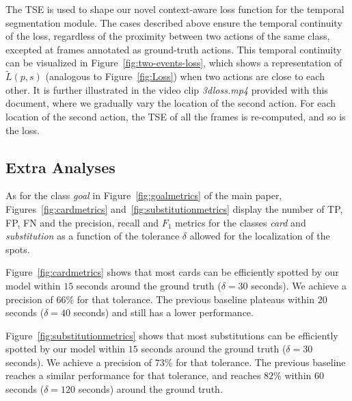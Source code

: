 \documentclass[10pt,twocolumn,letterpaper]{article}
\begin{document}
The TSE is used to shape our novel context-aware loss function for the temporal segmentation module. The cases described above ensure the temporal continuity of the loss, regardless of the proximity between two actions of the same class, excepted at frames annotated as ground-truth actions. This temporal continuity can be visualized in Figure~\ref{fig:two-events-loss}, which shows a representation of $\tilde{L}(p,s)$ (analogous to Figure~\ref{fig:Loss}) when two actions are close to each other. It is further illustrated in the video clip \emph{3dloss.mp4} provided with this document, where we gradually vary the location of the second action. For each location of the second action, the TSE of all the frames is re-computed, and so is the loss.









\subsection{Extra Analyses}

 As for the class \emph{goal} in Figure~\ref{fig:goalmetrics} of the main paper, Figures~\ref{fig:cardmetrics} and~\ref{fig:substitutionmetrics} display the number of TP, FP, FN and the precision, recall and $F_1$ metrics for the classes \emph{card} and \emph{substitution} as a function of the tolerance $\delta$ allowed for the localization of the spots. 

Figure~\ref{fig:cardmetrics} shows that most cards can be efficiently spotted by our model within $15$ seconds around the ground truth ($\delta=30$ seconds). We achieve a precision of $66\%$ for that tolerance. The previous baseline plateaus within $20$ seconds ($\delta=40$ seconds) and still has a lower performance. 

Figure~\ref{fig:substitutionmetrics} shows that most substitutions can be efficiently spotted by our model within $15$ seconds around the ground truth ($\delta=30$ seconds). We achieve a precision of $73\%$ for that tolerance. The previous baseline reaches a similar performance for that tolerance, and reaches $82\%$ within $60$ seconds ($\delta=120$ seconds) around the ground truth. 
\end{document}
